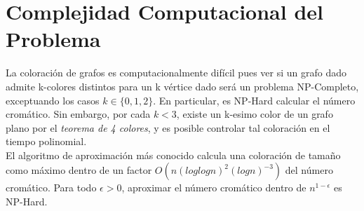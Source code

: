 \documentclass[12pt]{report}
\begin{document}
\section{Complejidad Computacional del Problema}
La coloración de grafos es computacionalmente difícil pues ver si un grafo dado admite k-colores distintos para un k vértice dado será un problema NP-Completo, exceptuando los casos $k \in \{0,1,2\}$. En particular, es NP-Hard calcular el número cromático. Sin embargo, por cada $k < 3$, existe un k-esimo color de un grafo plano por el \textsl{teorema de 4 colores}, y es posible controlar tal coloración en el tiempo polinomial.\\
El algoritmo de aproximación más conocido calcula una coloración de tamaño como máximo dentro de un factor $O(n(loglogn)^2 (log n)^{-3})$ del número cromático. Para todo $\epsilon > 0$, aproximar el número cromático dentro de $n^{1-\epsilon}$ es NP-Hard.\\
\end{document}
